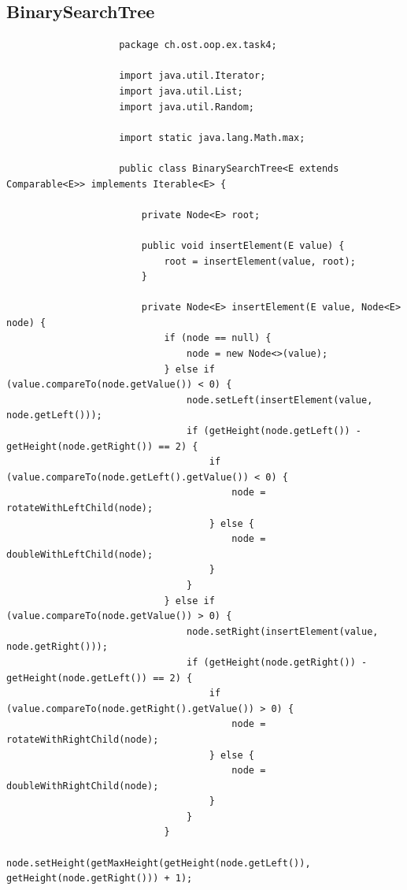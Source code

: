 \documentclass[a4paper, landscape, 8pt]{scrartcl}
\begin{document}
\begin{multicols*}{4}
            \subsection{BinarySearchTree}
                \begin{lstlisting}
                    package ch.ost.oop.ex.task4;

                    import java.util.Iterator;
                    import java.util.List;
                    import java.util.Random;

                    import static java.lang.Math.max;

                    public class BinarySearchTree<E extends Comparable<E>> implements Iterable<E> {

                        private Node<E> root;

                        public void insertElement(E value) {
                            root = insertElement(value, root);
                        }

                        private Node<E> insertElement(E value, Node<E> node) {
                            if (node == null) {
                                node = new Node<>(value);
                            } else if (value.compareTo(node.getValue()) < 0) {
                                node.setLeft(insertElement(value, node.getLeft()));
                                if (getHeight(node.getLeft()) - getHeight(node.getRight()) == 2) {
                                    if (value.compareTo(node.getLeft().getValue()) < 0) {
                                        node = rotateWithLeftChild(node);
                                    } else {
                                        node = doubleWithLeftChild(node);
                                    }
                                }
                            } else if (value.compareTo(node.getValue()) > 0) {
                                node.setRight(insertElement(value, node.getRight()));
                                if (getHeight(node.getRight()) - getHeight(node.getLeft()) == 2) {
                                    if (value.compareTo(node.getRight().getValue()) > 0) {
                                        node = rotateWithRightChild(node);
                                    } else {
                                        node = doubleWithRightChild(node);
                                    }
                                }
                            }
                            node.setHeight(getMaxHeight(getHeight(node.getLeft()), getHeight(node.getRight())) + 1);


\end{lstlisting}
\end{multicols*}
\end{document}
